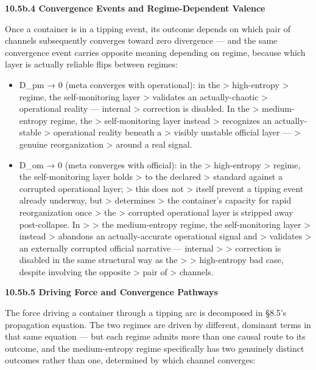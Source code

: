 \documentclass[
]{article}
\begin{document}
\textbf{10.5b.4 Convergence Events and Regime-Dependent Valence}

Once a container is in a tipping event, its outcome depends on which
pair of channels subsequently converges toward zero divergence --- and
the same convergence event carries opposite meaning depending on regime,
because which layer is actually reliable flips between regimes:

\begin{itemize}
\item
  D\_pm → 0 (meta converges with operational): in the \textgreater{}
  high-entropy \textgreater{} regime, the self-monitoring layer
  \textgreater{} validates an actually-chaotic \textgreater{}
  operational reality --- internal \textgreater{} correction is
  disabled. In the \textgreater{} medium-entropy regime, the
  \textgreater{} self-monitoring layer instead \textgreater{} recognizes
  an actually-stable \textgreater{} operational reality beneath a
  \textgreater{} visibly unstable official layer --- \textgreater{}
  genuine reorganization \textgreater{} around a real signal.
\item
  D\_om → 0 (meta converges with official): in the \textgreater{}
  high-entropy \textgreater{} regime, the self-monitoring layer holds
  \textgreater{} to the declared \textgreater{} standard against a
  corrupted operational layer; \textgreater{} this does not
  \textgreater{} itself prevent a tipping event already underway, but
  \textgreater{} determines \textgreater{} the container's capacity for
  rapid reorganization once \textgreater{} the \textgreater{} corrupted
  operational layer is stripped away post-collapse. In \textgreater{}
  \textgreater{} the medium-entropy regime, the self-monitoring layer
  \textgreater{} instead \textgreater{} abandons an actually-accurate
  operational signal and \textgreater{} validates \textgreater{} an
  externally corrupted official narrative --- internal \textgreater{}
  \textgreater{} correction is disabled in the same structural way as
  the \textgreater{} \textgreater{} high-entropy bad case, despite
  involving the opposite \textgreater{} pair of \textgreater{} channels.
\end{itemize}

\textbf{10.5b.5 Driving Force and Convergence Pathways}

The force driving a container through a tipping arc is decomposed in
§8.5's propagation equation. The two regimes are driven by different,
dominant terms in that same equation --- but each regime admits more
than one causal route to its outcome, and the medium-entropy regime
specifically has two genuinely distinct outcomes rather than one,
determined by which channel converges:
\end{document}
